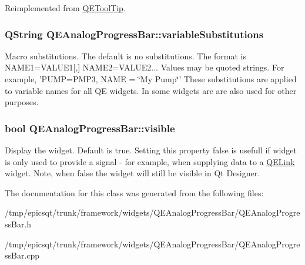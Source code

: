 Reimplemented from \hyperlink{classQEToolTip}{QEToolTip}.

\hypertarget{classQEAnalogProgressBar_afc7fe5bd7881f0a998cef3d33e056182}{
\subsubsection[{variableSubstitutions}]{\setlength{\rightskip}{0pt plus 5cm}QString QEAnalogProgressBar::variableSubstitutions}}
\label{classQEAnalogProgressBar_afc7fe5bd7881f0a998cef3d33e056182}
Macro substitutions. The default is no substitutions. The format is NAME1=VALUE1\mbox{[},\mbox{]} NAME2=VALUE2... Values may be quoted strings. For example, 'PUMP=PMP3, NAME = \char`\"{}My Pump\char`\"{}' These substitutions are applied to variable names for all QE widgets. In some widgets are are also used for other purposes. \hypertarget{classQEAnalogProgressBar_a814a89e7944258acf7dae8f05ae43554}{
\subsubsection[{visible}]{\setlength{\rightskip}{0pt plus 5cm}bool QEAnalogProgressBar::visible}}
\label{classQEAnalogProgressBar_a814a89e7944258acf7dae8f05ae43554}
Display the widget. Default is true. Setting this property false is usefull if widget is only used to provide a signal -\/ for example, when supplying data to a \hyperlink{classQELink}{QELink} widget. Note, when false the widget will still be visible in Qt Designer. 

The documentation for this class was generated from the following files:\begin{DoxyCompactItemize}
\item 
/tmp/epicsqt/trunk/framework/widgets/QEAnalogProgressBar/QEAnalogProgressBar.h\item 
/tmp/epicsqt/trunk/framework/widgets/QEAnalogProgressBar/QEAnalogProgressBar.cpp\end{DoxyCompactItemize}
